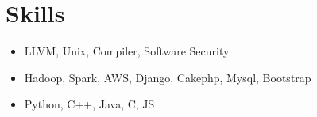 \documentclass[a4paper,10pt]{article}
\begin{document}
\section{Skills}
\begin{itemize}
\item LLVM, Unix, Compiler, Software Security
\item Hadoop, Spark, AWS, Django, Cakephp, Mysql, Bootstrap
\item Python, C++, Java, C, JS
\end{itemize}



\end{document}
